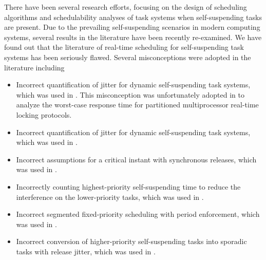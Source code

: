 There have been several research efforts, focusing on the design of scheduling algorithms and schedulability analyses of task systems when self-suspending tasks are present. Due to the prevailing self-suspending scenarios in modern computing systems, several results in the literature have been recently re-examined. We have found out that the literature of real-time scheduling for self-suspending task systems has been seriously flawed. Several misconceptions were adopted in the literature including 
\begin{itemize}
\item Incorrect quantification of jitter for dynamic self-suspending
  task systems, which was used in
  \cite{ECRTS-AudsleyB04,RTAS-AudsleyB04,RTCSA-KimCPKH95,MingLiRTCSA1994}.  This
  misconception was unfortunately adopted in \cite{zeng-2011,bbb-2013,yang-2013,kim-2014,han-2014,carminati-2014,yang-2014,lakshmanan-2009} to analyze the worst-case response time for
  partitioned multiprocessor real-time locking protocols.
\item Incorrect quantification of jitter for dynamic self-suspending
  task systems, which was used in  \cite{RTCSA-BletsasA05}.
\item Incorrect assumptions for a critical instant with
  synchronous releases, which was used in \cite{LR:rtas10}.
\item Incorrectly counting highest-priority self-suspending time to reduce the
  interference on the lower-priority tasks, which was used in  \cite{RTSS-KimANR13}. 
\item Incorrect segmented fixed-priority scheduling with period
  enforcement, which was used in \cite{RTSS-KimANR13,DBLP:journals/ieicet/DingTT09}.
\item Incorrect conversion of higher-priority self-suspending tasks into sporadic tasks with release jitter, which was used in \cite{ecrts15nelissen}.
\end{itemize}


